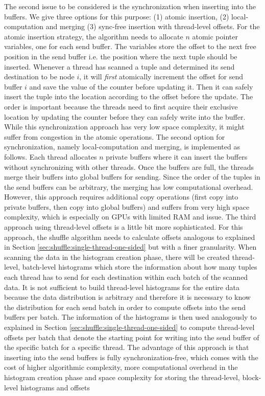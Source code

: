 The second issue to be considered is the synchronization when inserting into the buffers.
We give three options for this purpose:
(1) atomic insertion,
(2) local-computation and merging
(3) sync-free insertion with thread-level offsets.
For the atomic insertion strategy, the algorithm needs to allocate $n$ atomic pointer variables, one for each send buffer.
The variables store the offset to the next free position in the send buffer i.e. the position where the next tuple should be inserted.
Whenever a thread has scanned a tuple and determined its send destination to be node $i$, it will \textit{first} atomically increment the offset for send buffer $i$ and save the value of the counter before updating it.
Then it can safely insert the tuple into the location according to the offset before the update.
The order is important because the threads need to first acquire their exclusive location by updating the counter before they can safely write into the buffer.
While this synchronization approach has very low space complexity, it might suffer from congestion in the atomic operations.
The second option for synchronization, namely local-computation and merging, is implemented as follows.
Each thread allocates $n$ private buffers where it can insert the buffers without synchronizing with other threads.
Once the buffers are full, the threads merge their buffers into global buffers for sending.
Since the order of the tuples in the send buffers can be arbitrary, the merging has low computational overhead.
However, this approach requires additional copy operations (first copy into private buffers,  then copy into global buffers) and suffers from very high space complexity, which is especially on GPUs with limited RAM and issue.
The third approach using thread-level offsets is a little bit more sophisticated.
For this approach, the shuffle algorithm needs to calculate offsets analogous to explained in Section \ref{sec:shuffle:single-thread-one-sided} but with a finer granularity.
When scanning the data in the histogram creation phase, there will be created thread-level, batch-level histograms which store the information about how many tuples each thread has to send for each destination within each batch of the scanned data.
It is not sufficient to build thread-level histograms for the entire data because the data distribution is arbitrary and therefore it is necessary to know the distribution for each send batch in order to compute offsets into the send buffers per batch.
The information of the histograms is then used analogously to explained in Section \ref{sec:shuffle:single-thread-one-sided} to compute thread-level offsets per batch that denote the starting point for writing into the send buffer of the specific batch for a specific thread.
The advantage of this approach is that inserting into the send buffers is fully synchronization-free, which comes with the cost of higher algorithmic complexity, more computational overhead in the histogram creation phase and space complexity for storing the thread-level, block-level histograms and offsets

